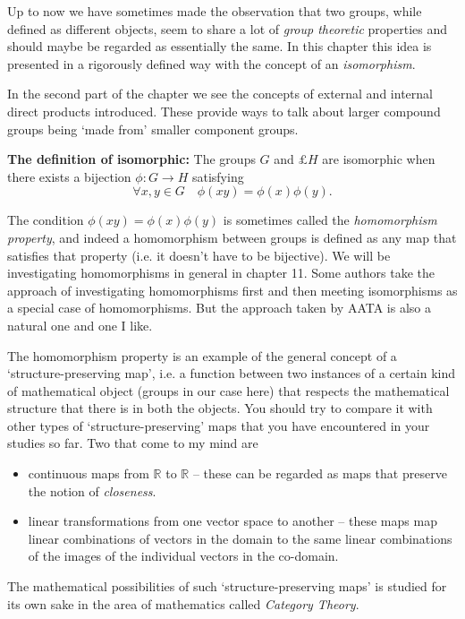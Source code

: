 \documentclass[oneside,10pt]{amsart}
\begin{document}

Up to now we have sometimes made the observation that two groups, while defined as different objects, seem to share a lot of \emph{group theoretic} properties and should maybe be regarded as essentially the same. In this chapter this idea is presented in a rigorously defined way with the concept of an \emph{isomorphism}.

In the second part of the chapter we see the concepts of external and internal direct products introduced. These provide ways to talk about larger compound groups being `made from' smaller component groups.
\vskip 4pt

\textbf{The definition of isomorphic:}
The groups $G$ and $£H$ are isomorphic when there exists a bijection $\phi:G \to H$ satisfying
$$\forall x,y \in G \quad \phi(xy) = \phi(x)\phi(y).$$

The condition $\phi(xy)=\phi(x)\phi(y)$ is sometimes called the \emph{homomorphism property}, and indeed a homomorphism between groups is defined as any map that satisfies that property (i.e. it doesn't have to be bijective). We will be investigating homomorphisms in general in chapter 11. Some authors take the approach of investigating homomorphisms first and then meeting isomorphisms as a special case of homomorphisms. But the approach taken by AATA is also a natural one and one I like.

The homomorphism property is an example of the general concept of a `structure-preserving map', i.e. a function between two instances of a certain kind of mathematical object (groups in our case here) that respects the mathematical structure that there is in both the objects. You should try to compare it with other types of `structure-preserving' maps that you have encountered in your studies so far. Two that come to my mind are

\begin{itemize}
\item
continuous maps from $\mathbb{R}$ to $\mathbb{R}$ -- these can be regarded as maps that preserve the notion of \emph{closeness}.
\item
linear transformations from one vector space to another -- these maps map linear combinations of vectors in the domain to the same linear combinations of the images of the individual vectors in the co-domain.
\end{itemize}
The mathematical possibilities of such `structure-preserving maps' is studied for its own sake in the area of mathematics called \emph{Category Theory}.
\end{document}
